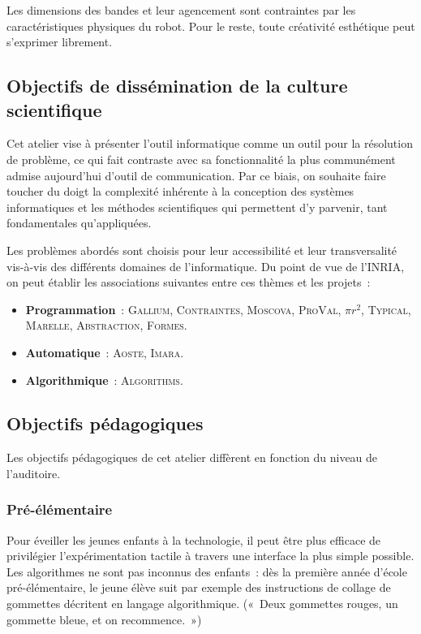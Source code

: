 \documentclass[11pt,a4paper]{article}
\begin{document}
Les dimensions des bandes et leur agencement sont contraintes par les
caractéristiques physiques du robot. Pour le reste, toute créativité
esthétique peut s'exprimer librement.

\subsection{Objectifs de dissémination de la culture scientifique}

Cet atelier vise à présenter l'outil informatique comme un outil pour
la résolution de problème, ce qui fait contraste avec sa fonctionnalité la
plus communément admise aujourd'hui d'outil de communication. Par ce
biais, on souhaite faire toucher du doigt la complexité inhérente à la
conception des systèmes informatiques et les méthodes scientifiques
qui permettent d'y parvenir, tant fondamentales qu'appliquées. 

Les problèmes abordés sont choisis pour leur accessibilité et leur
transversalité vis-à-vis des différents domaines de l'informatique. Du
point de vue de l'INRIA, on peut établir les associations suivantes
entre ces thèmes et les projets~:

\begin{itemize}
\item \textbf{Programmation}~: \textsc{Gallium}, \textsc{Contraintes}, \textsc{Moscova}, 
\textsc{ProVal}, $\pi r^2$, \textsc{Typical}, \textsc{Marelle}, \textsc{Abstraction}, 
\textsc{Formes}. 

\item \textbf{Automatique}~: \textsc{Aoste}, \textsc{Imara}.

\item \textbf{Algorithmique}~: \textsc{Algorithms}. 
\end{itemize}

\subsection{Objectifs pédagogiques}

Les objectifs pédagogiques de cet atelier diffèrent en fonction du niveau de l'auditoire. 

\subsubsection{Pré-élémentaire}

Pour éveiller les jeunes enfants à la technologie, il peut être plus
efficace de privilégier l'expérimentation tactile à travers une
interface la plus simple possible. Les algorithmes ne sont pas
inconnus des enfants~: dès la première année d'école pré-élémentaire,
le jeune élève suit par exemple des instructions de collage de
gommettes décritent en langage algorithmique. («~Deux gommettes rouges, un gommette bleue, 
et on recommence.~»)
\end{document}
